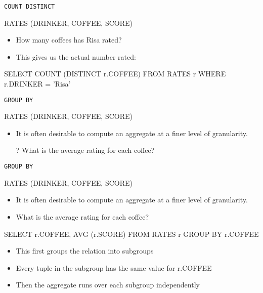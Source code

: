 \documentclass[aspectratio=169]{beamer}
\begin{document}
\begin{frame}[fragile]{\texttt{COUNT DISTINCT}}

RATES (DRINKER, COFFEE, SCORE)

\begin{itemize}
\item How many coffees has Risa rated?
\item This gives us the actual number rated:
\end{itemize}

\begin{SQL}
SELECT COUNT (DISTINCT r.COFFEE)
FROM RATES r
WHERE r.DRINKER = 'Risa'
\end{SQL}
\end{frame}

\begin{frame}{\texttt{GROUP BY}}

RATES (DRINKER, COFFEE, SCORE)

\begin{itemize}
\item It is often desirable to compute an aggregate at a finer level of granularity.
\item[?] What is the average rating for each coffee?
\end{itemize}
\end{frame}

\begin{frame}[fragile]{\texttt{GROUP BY}}

RATES (DRINKER, COFFEE, SCORE)

\begin{itemize}
\item It is often desirable to compute an aggregate at a finer level of granularity.
\item What is the average rating for each coffee?
\end{itemize}

\begin{SQL}
SELECT r.COFFEE, AVG (r.SCORE)
FROM RATES r
GROUP BY r.COFFEE
\end{SQL}

\begin{itemize}
	\item This first groups the relation into subgroups
	\item Every tuple in the subgroup has the same value for r.COFFEE
	\item Then the aggregate runs over each subgroup independently
\end{itemize}	
\end{frame}
\end{document}
